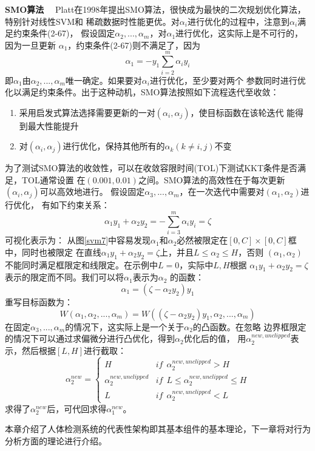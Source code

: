 \textbf{SMO算法}~~
Platt在1998年提出SMO算法\cite{SMO}，很快成为最快的二次规划优化算法，特别针对线性SVM和
稀疏数据时性能更优。对$\alpha_i$进行优化的过程中，注意到$\alpha_i$满足约束条件(2-67)，
假设固定$\alpha_2,...,\alpha_m$，对$\alpha_1$进行优化，这实际上是不可行的，因为一旦更新
$\alpha_1$，约束条件(2-67)则不满足了，因为
\begin{equation}
    \alpha_1=-y_1\sum^m_{i=2}\alpha_iy_i
\end{equation}
即$\alpha_1$由$\alpha_2,...,\alpha_m$唯一确定。如果要对$\alpha_i$进行优化，至少要对两个
参数同时进行优化以满足约束条件。出于这种动机，SMO算法按照如下流程迭代至收敛：
\begin{enumerate}
    \item 采用启发式算法选择需要更新的一对$(\alpha_i,\alpha_j)$，使目标函数在该轮迭代
        能得到最大性能提升
    \item 对$(\alpha_i,\alpha_j)$进行优化，保持其他所有的$\alpha_k(k\neq{}i,j)$不变
\end{enumerate}

为了测试SMO算法的收敛性，可以在收敛容限时间(TOL)下测试KKT条件是否满足，TOL通常设置
在$(0.001,0.01)$之间\cite{SMO}。SMO算法的高效性在于每次更新$(\alpha_i,\alpha_j)$可以高效地进行。
假设固定$\alpha_3,...,\alpha_m$，在一次迭代中需要对$(\alpha_1,\alpha_2)$进行优化，
有如下约束关系：
\begin{equation}
    \alpha_1y_1+\alpha_2y_2=-\sum^m_{i=3}\alpha_iy_i=\zeta
\end{equation}
可视化表示为：
从图\ref{svm7}中容易发现$\alpha_1$和$\alpha_2$必然被限定在$[0,C]\times[0,C]$框中，同时也被限定
在直线$\alpha_1y_1+\alpha_2y_2=\zeta$上，并且$L\leq\alpha_2\leq{}H$，否则
$(\alpha_1,\alpha_2)$不能同时满足框限定和线限定。在示例中$L=0$，实际中$L,H$根据
$\alpha_1y_1+\alpha_2y_2=\zeta$表示的限定而不同。我们可以将$\alpha_1$表示为$\alpha_2$
的函数：
\begin{equation}
    \alpha_1=(\zeta-\alpha_2y_2)y_1
\end{equation}
重写目标函数为：
\begin{equation}
    W(\alpha_1,\alpha_2,...,\alpha_m)=W((\zeta-\alpha_2y_2)y_1,\alpha_2,...,\alpha_m)
\end{equation}
在固定$\alpha_3,...,\alpha_m$的情况下，这实际上是一个关于$\alpha_2$的凸函数。在忽略
边界框限定的情况下可以通过求偏微分进行凸优化，得到$\alpha_2$优化后的值，
用$\alpha_2^{new,unclipped}$表示，然后根据$[L,H]$进行截取：
\begin{equation}
    \alpha_2^{new}=\left\{\begin{array}{ll}
            H&if~~\alpha_2^{new,unclipped}>H\\
            \alpha_2^{new,unclipped}&if~~L\leq\alpha_2^{new,unclipped}\leq{}H\\
            L&if~~\alpha_2^{new,unclipped}<L
        \end{array}\right.
\end{equation}
求得了$\alpha_2^{new}$后，可代回求得$\alpha_1^{new}$。

本章介绍了人体检测系统的代表性架构即其基本组件的基本理论，下一章将对行为分析方面的理论进行介绍。
